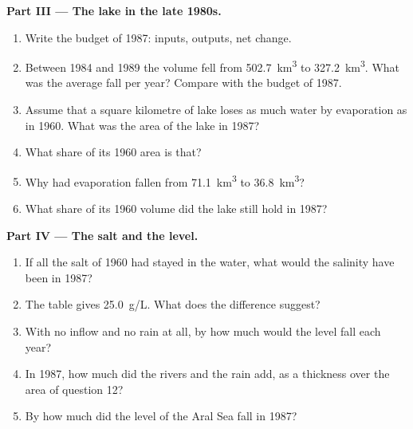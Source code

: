 \begin{problem}
\medskip
\noindent\textbf{Part III --- The lake in the late 1980s.}
\begin{enumerate}[resume]
  \item Write the budget of 1987: inputs, outputs, net change.
  \item Between 1984 and 1989 the volume fell from \qty{502.7}{km^3} to
        \qty{327.2}{km^3}. What was the average fall per year? Compare with
        the budget of 1987.
  \item Assume that a square kilometre of lake loses as much water by
        evaporation as in 1960. What was the area of the lake in 1987?
  \item What share of its 1960 area is that?
  \item Why had evaporation fallen from \qty{71.1}{km^3} to
        \qty{36.8}{km^3}?
  \item What share of its 1960 volume did the lake still hold in 1987?
\end{enumerate}

\medskip
\noindent\textbf{Part IV --- The salt and the level.}
\begin{enumerate}[resume]
  \item If all the salt of 1960 had stayed in the water, what would the
        salinity have been in 1987?
  \item The table gives \qty{25.0}{g/L}. What does the difference suggest?
  \item With no inflow and no rain at all, by how much would the level fall
        each year?
  \item In 1987, how much did the rivers and the rain add, as a thickness
        over the area of question 12?
  \item By how much did the level of the Aral Sea fall in 1987?
\end{enumerate}
\end{problem}
